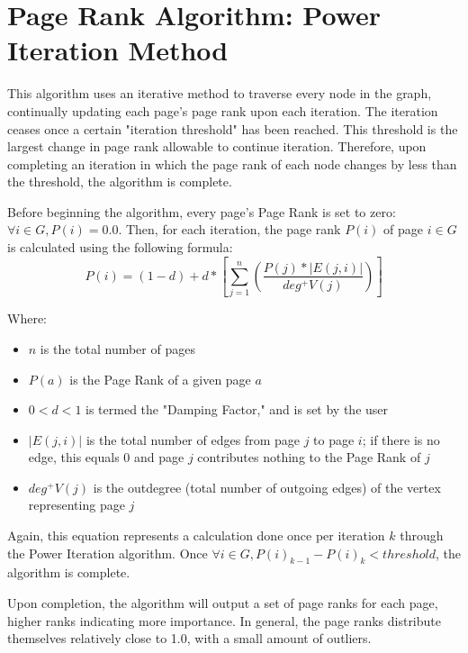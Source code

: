 \documentclass[11pt]{article}
\begin{document}
\section*{Page Rank Algorithm: Power Iteration Method}
\label{sec:power}
This algorithm uses an iterative method to traverse every node in the graph, continually updating each page's page rank upon each iteration. The iteration ceases once a certain "iteration threshold" has been reached. This threshold is the largest change in page rank allowable to continue iteration. Therefore, upon completing an iteration in which the page rank of each node changes by less than the threshold, the algorithm is complete.
\newline

Before beginning the algorithm, every page's Page Rank is set to zero: $\forall i \in G, P(i) = 0.0$. Then, for each iteration, the page rank $P(i)$ of page $i \in G$ is calculated using the following formula:
\label{eq:poweriter}
\[
P(i) = (1 - d) + d *\left[ \sum_{j=1}^{n} \left(\frac{P(j) * |E(j,i)|}{deg^+V(j)}\right) \right]
\]

Where:
\begin{itemize}
\item $n$ is the total number of pages
\item $P(a)$ is the Page Rank of a given page $a$
\item $0 < d < 1$ is termed the "Damping Factor," and is set by the user 
\item $|E(j,i)|$ is the total number of edges from page $j$ to page $i$; if there is no edge, this equals $0$ and page $j$ contributes nothing to the Page Rank of $j$
\item $deg^+V(j)$ is the outdegree (total number of outgoing edges) of the vertex representing page $j$
\end{itemize}

Again, this equation represents a calculation done once per iteration $k$ through the Power Iteration algorithm. Once $\forall i \in G, P(i)_{k-1} - P(i)_k < threshold$, the algorithm is complete.
\newline

Upon completion, the algorithm will output a set of page ranks for each page, higher ranks indicating more importance. In general, the page ranks distribute themselves relatively close to 1.0, with a small amount of outliers.
\end{document}
